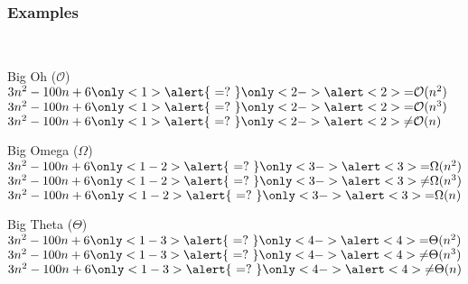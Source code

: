 \documentclass[aspectratio=169]{beamer}
\begin{document}
\begin{frame}[t]\frametitle{Examples}
    ~\\[-8mm]
    \begin{block}{Big Oh ($\mathcal{O}$)}
        $3n^2 -100n+6 \only<1>{\alert{~{=}?~}}\only<2->{\alert<2>{=   }} \mathcal{O}(n^2)$
      \\$3n^2 -100n+6 \only<1>{\alert{~{=}?~}}\only<2->{\alert<2>{=   }} \mathcal{O}(n^3)$
      \\$3n^2 -100n+6 \only<1>{\alert{~{=}?~}}\only<2->{\alert<2>{\neq}} \mathcal{O}(n)$  
    \end{block}

    \begin{block}{Big Omega ($\Omega$)}
        $3n^2 -100n+6 \only<1-2>{\alert{~{=}?~}}\only<3->{\alert<3>{=   }} \Omega(n^2)$
      \\$3n^2 -100n+6 \only<1-2>{\alert{~{=}?~}}\only<3->{\alert<3>{\neq}} \Omega(n^3)$
      \\$3n^2 -100n+6 \only<1-2>{\alert{~{=}?~}}\only<3->{\alert<3>{=   }} \Omega(n)$  
    \end{block}

    \begin{block}{Big Theta ($\Theta$)}
        $3n^2 - 100n + 6 \only<1-3>{\alert{~{=}?~}}\only<4->{\alert<4>{=   }} \Theta(n^2)$
      \\$3n^2 - 100n + 6 \only<1-3>{\alert{~{=}?~}}\only<4->{\alert<4>{\neq}} \Theta(n^3)$
      \\$3n^2 - 100n + 6 \only<1-3>{\alert{~{=}?~}}\only<4->{\alert<4>{\neq}} \Theta(n)$  
    \end{block}

\end{frame}



\end{document}
